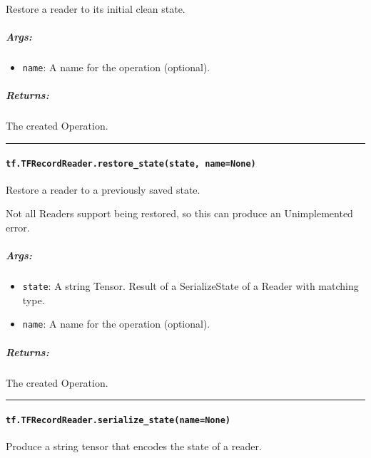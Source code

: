 Restore a reader to its initial clean state.

\subparagraph{Args: }\label{args-33}

\begin{itemize}
\tightlist
\item
  \texttt{name}: A name for the operation (optional).
\end{itemize}

\subparagraph{Returns: }\label{returns-28}

The created Operation.

\begin{center}\rule{0.5\linewidth}{\linethickness}\end{center}

\paragraph{\texorpdfstring{\texttt{tf.TFRecordReader.restore\_state(state,\ name=None)}
}{tf.TFRecordReader.restore\_state(state, name=None) }}\label{tf.tfrecordreader.restoreux5fstatestate-namenone}

Restore a reader to a previously saved state.

Not all Readers support being restored, so this can produce an
Unimplemented error.

\subparagraph{Args: }\label{args-34}

\begin{itemize}
\tightlist
\item
  \texttt{state}: A string Tensor. Result of a SerializeState of a
  Reader with matching type.
\item
  \texttt{name}: A name for the operation (optional).
\end{itemize}

\subparagraph{Returns: }\label{returns-29}

The created Operation.

\begin{center}\rule{0.5\linewidth}{\linethickness}\end{center}

\paragraph{\texorpdfstring{\texttt{tf.TFRecordReader.serialize\_state(name=None)}
}{tf.TFRecordReader.serialize\_state(name=None) }}\label{tf.tfrecordreader.serializeux5fstatenamenone}

Produce a string tensor that encodes the state of a reader.

